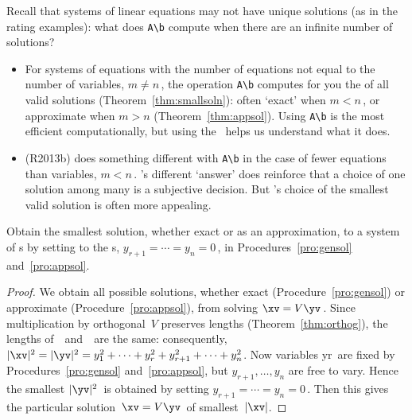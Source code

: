 Recall that systems of linear equations may not have unique solutions (as in the rating examples): what does \verb|A\b| compute when there are an infinite number of solutions?
\begin{itemize}
\item For systems of equations with the number of equations not equal to the number of variables, \(m\neq n\)\,, the \script[2] operation \verb|A\b| computes for you the  of all valid solutions (Theorem~\ref{thm:smallsoln}): often `exact' when \(m<n\)\,, or approximate when \(m>n\) (Theorem~\ref{thm:appsol}).  
Using \verb|A\b| is the most efficient computationally, but using the \svd\ helps us understand what it does.

\item \script[1] (R2013b) does something different with \verb|A\b| in the case of fewer equations than variables, \(m<n\)\,. 
\script[1]'s different `answer' does reinforce that a choice of one solution among many is a subjective decision.
But \script[2]'s choice of the smallest valid solution is often more appealing.

\end{itemize}

\begin{theorem} \label{thm:smallsoln}
Obtain the {smallest solution}, whether exact or as an approximation, to a system of s by setting to  the s, \(y_{r+1}=\cdots=y_n=0\)\,, in Procedures~\ref{pro:gensol} and~\ref{pro:appsol}.
\end{theorem}
\begin{proof} %
We obtain all possible solutions, whether exact (Procedure~\ref{pro:gensol}) or approximate (Procedure~\ref{pro:appsol}), from solving \(\xv=V\yv\)\,.
Since multiplication by orthogonal~\(V\) preserves lengths (Theorem~\ref{thm:orthog}), the lengths of~\xv\ and~\yv\ are the same: consequently, \(|\xv|^2=|\yv|^2=y_1^2+\cdots+y_r^2+y_{r+1}^2+\cdots+y_n^2\).  
Now variables \hlist yr\ are fixed by Procedures~\ref{pro:gensol} and~\ref{pro:appsol},
but \(y_{r+1},\ldots,y_n\) are free to vary.
Hence the smallest \(|\yv|^2\)~is obtained by setting \(y_{r+1}=\cdots=y_n=0\)\,. 
Then this gives the particular solution~\(\xv=V\yv\)\ of smallest~\(|\xv|\).
\end{proof}


